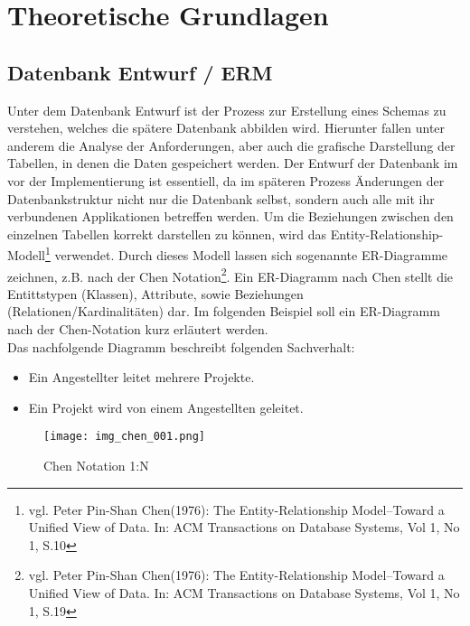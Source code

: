 \chapter{Theoretische Grundlagen}
\label{cha:theogrund}

\section{Datenbank Entwurf / ERM}
\label{sec:erm}

Unter dem Datenbank Entwurf ist der Prozess zur Erstellung eines Schemas zu verstehen, welches die spätere Datenbank abbilden wird.
Hierunter fallen unter anderem die Analyse der Anforderungen, aber auch die grafische Darstellung der Tabellen, in denen die Daten gespeichert werden.
Der Entwurf der Datenbank im vor der Implementierung ist essentiell, da im späteren Prozess Änderungen der Datenbankstruktur nicht nur die Datenbank selbst, sondern auch alle mit ihr verbundenen Applikationen betreffen werden.
Um die Beziehungen zwischen den einzelnen Tabellen korrekt darstellen zu können, wird das Entity-Relationship-Modell\footnote{vgl. Peter Pin-Shan Chen(1976): The Entity-Relationship Model--Toward a Unified View of Data. In: ACM Transactions on Database Systems, Vol 1, No 1, S.10} verwendet.
Durch dieses Modell lassen sich sogenannte ER-Diagramme zeichnen, z.B. nach der Chen Notation\footnote{vgl. Peter Pin-Shan Chen(1976): The Entity-Relationship Model--Toward a Unified View of Data. In: ACM Transactions on Database Systems, Vol 1, No 1, S.19}.
Ein ER-Diagramm nach Chen stellt die Entittstypen (Klassen), Attribute, sowie Beziehungen (Relationen/Kardinalitäten) dar.
Im folgenden Beispiel soll ein ER-Diagramm nach der Chen-Notation kurz erläutert werden.\\

Das nachfolgende Diagramm beschreibt folgenden Sachverhalt:

\begin{itemize}
\item Ein Angestellter leitet mehrere Projekte.
\item Ein Projekt wird von einem Angestellten geleitet.
\end{itemize}

\begin{figure}[H]
\begin{center}
\texttt{[image: img\_chen\_001.png]}
\caption{Chen Notation 1:N}
\label{chenpic1}
\end{center}
\end{figure}


